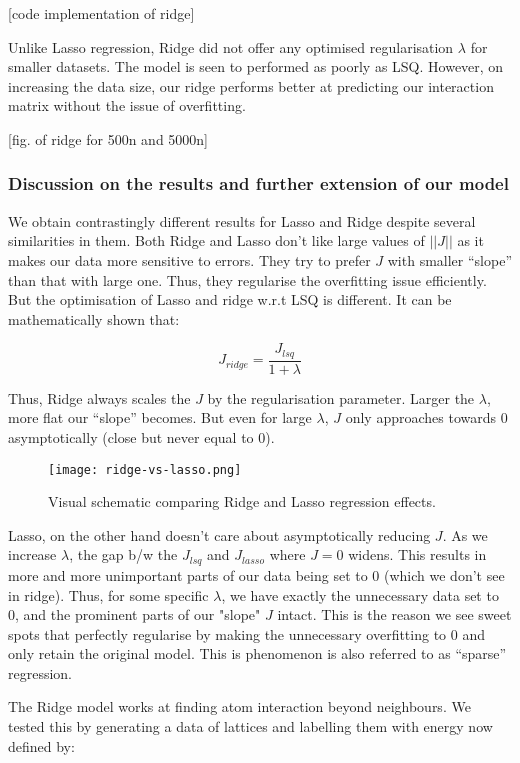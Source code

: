 [code implementation of ridge]

Unlike Lasso regression, Ridge did not offer any optimised regularisation \(\lambda\) for smaller datasets. The model is seen to performed as poorly as LSQ. However, on increasing the data size, our ridge performs better at predicting our interaction matrix without the issue of overfitting.

[fig. of ridge for 500n and 5000n]

\subsubsection{Discussion on the results and further extension of our model}

We obtain contrastingly different results for Lasso and Ridge despite several similarities in them.
Both Ridge and Lasso don't like large values of \(||J||\) as it makes our data more sensitive to errors. They try to prefer $J$ with smaller ``slope'' than that with large one.
Thus, they regularise the overfitting issue efficiently.
But the optimisation of Lasso and ridge w.r.t LSQ is different.
It can be mathematically shown that:

\[J_{ridge}=\frac{J_{lsq}}{1+\lambda}\]

Thus, Ridge always scales the $J$ by the regularisation parameter.
Larger the \(\lambda\), more flat our ``slope'' becomes.
But even for large \(\lambda\), $J$ only approaches towards 0 asymptotically (close but never equal to 0).

\begin{figure}[h!]
    \centering
    \texttt{[image: ridge-vs-lasso.png]}
    \caption{Visual schematic comparing Ridge and Lasso regression effects.}
\end{figure}

Lasso, on the other hand doesn't care about asymptotically reducing $J$.
As we increase \(\lambda\), the gap b/w the \(J_{lsq}\) and \(J_{lasso}\) where $J=0$ widens.
This results in more and more unimportant parts of our data being set to 0 (which we don't see in ridge).
Thus, for some specific \(\lambda\), we have exactly the unnecessary data set to 0, and the prominent parts of our "slope" $J$ intact.
This is the reason we see sweet spots that perfectly regularise by making the unnecessary overfitting to 0 and only retain the original model.
This is phenomenon is also referred to as ``sparse'' regression.

The Ridge model works at finding atom interaction beyond neighbours. We tested this by generating a data of lattices and labelling them with energy now defined by:


